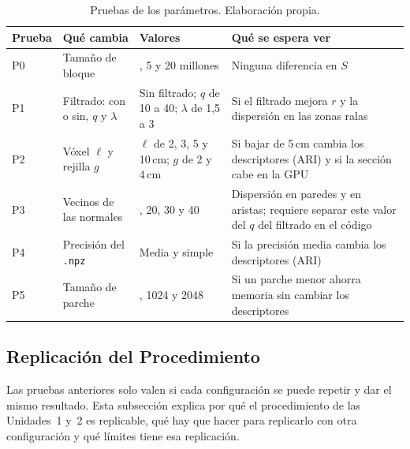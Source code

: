 \begin{table}[!htbp]
\centering
{}\small
\setlength{\tabcolsep}{4pt}
\caption[Pruebas de los parámetros]{Pruebas de los parámetros. Elaboración propia.}
\label{tab:pruebas}
\begin{tabularx}{\linewidth}{@{}l>{\raggedright\arraybackslash\hsize=0.9\hsize}X>{\raggedright\arraybackslash\hsize=0.9\hsize}X>{\raggedright\arraybackslash\hsize=1.2\hsize}X@{}}
\toprule
\textbf{Prueba} & \textbf{Qué cambia} & \textbf{Valores} & \textbf{Qué se espera ver} \\
\midrule
P0 & Tamaño de bloque & 1, 5 y 20 millones & Ninguna diferencia en $S$ \\
P1 & Filtrado: con o sin, $q$ y $\lambda$ & Sin filtrado; $q$ de 10 a 40; $\lambda$ de 1,5 a 3 & Si el filtrado mejora $r$ y la dispersión en las zonas ralas \\
P2 & Vóxel $\ell$ y rejilla $g$ & $\ell$ de 2, 3, 5 y 10\,cm; $g$ de 2 y 4\,cm & Si bajar de 5\,cm cambia los descriptores (ARI) y si la sección cabe en la GPU \\
P3 & Vecinos de las normales & 10, 20, 30 y 40 & Dispersión en paredes y en aristas; requiere separar este valor del $q$ del filtrado en el código \\
P4 & Precisión del \texttt{.npz} & Media y simple & Si la precisión media cambia los descriptores (ARI) \\
P5 & Tamaño de parche & 512, 1024 y 2048 & Si un parche menor ahorra memoria sin cambiar los descriptores \\
\bottomrule
\end{tabularx}
\end{table}

\FloatBarrier
\subsection{Replicación del Procedimiento}
\label{sec:param-replicacion}

Las pruebas anteriores solo valen si cada configuración se puede repetir y dar
el mismo resultado. Esta subsección explica por qué el procedimiento de las
Unidades~1 y~2 es replicable, qué hay que hacer para replicarlo con otra
configuración y qué límites tiene esa replicación.

